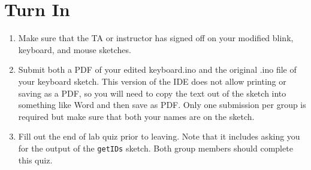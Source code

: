 \section{Turn In}
\begin{enumerate}
    \item Make sure that the TA or instructor has signed off on your modified blink, keyboard, and mouse sketches.
    \item Submit both a PDF of your edited keyboard.ino and the original .ino file of your keyboard sketch. 
            This version of the IDE does not allow printing or saving as a PDF, so you will need to copy the 
            text out of the sketch into something like Word and then save as PDF. Only one 
            submission per group is required but make sure that both your names are on the sketch.
    \item Fill out the end of lab quiz prior to leaving. Note that it includes asking you 
            for the output of the \lstinline$getIDs$ sketch. Both group members should complete
            this quiz.
\end{enumerate}

